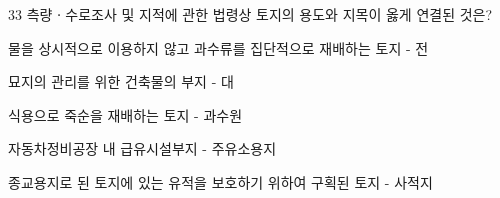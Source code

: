 \begin{question}{33}
측량ㆍ수로조사 및 지적에 관한 법령상 토지의 용도와 지목이 옳게 연결된 것은?
\begin{choices}
  \item 물을 상시적으로 이용하지 않고 과수류를 집단적으로 재배하는 토지 - 전
  \item 묘지의 관리를 위한 건축물의 부지 - 대
  \item 식용으로 죽순을 재배하는 토지 - 과수원
  \item 자동차정비공장 내 급유시설부지 - 주유소용지
  \item 종교용지로 된 토지에 있는 유적을 보호하기 위하여 구획된 토지 - 사적지
\end{choices}
\end{question}
